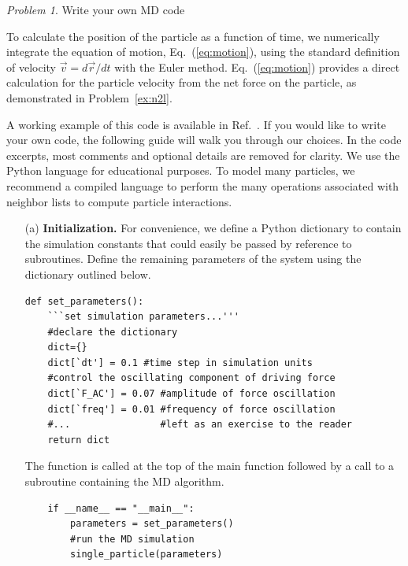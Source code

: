 \documentclass[preprint,showpacs,preprintnumbers,amsmath,amssymb,aps,prb]{revtex4-1}
\theoremstyle{remark}
\newtheorem{problem}{Problem}
\begin{document}
\begin{problem}{Write your own MD code}
  \label{ex:euler}
 
  \noindent To calculate the position of the particle
  as a function of time,
  we
  numerically integrate the equation of motion,
  Eq.~(\ref{eq:motion}),
  using
  the standard definition of velocity
  $\vec{v} = d\vec{r}/dt$ 
  with the %
  Euler method.
  Eq.~(\ref{eq:motion}) provides
  a direct calculation for the particle velocity
  from the net force on the particle,
  as demonstrated in Problem~\ref{ex:n2l}.

    A working example of this code is available
  in Ref.~.
  If you would like to write your own code,
  the following guide
  will walk you through our choices.
  In the code excerpts,
  most comments and optional details are removed for clarity.
We use the Python 
  language
  for educational purposes.
  To model many particles,
we recommend a   
  compiled  language
  to perform the many operations associated
  with neighbor lists to compute particle interactions.
  
  \begin{enumerate}
    
  \item[(a)] {\bf Initialization.}
    For convenience,
    we define a Python dictionary
    to contain the simulation constants
    that could easily be passed by reference
    to subroutines.
    Define 
    the remaining parameters of the system using the dictionary outlined below.
    \begin{verbatim}
def set_parameters():           
    ```set simulation parameters...'''
    #declare the dictionary     
    dict={}  
    dict[`dt'] = 0.1 #time step in simulation units
    #control the oscillating component of driving force
    dict[`F_AC'] = 0.07 #amplitude of force oscillation
    dict[`freq'] = 0.01 #frequency of force oscillation
    #...                #left as an exercise to the reader
    return dict
    \end{verbatim}

    The function is called at the top of the main function
    followed by a call to a subroutine
    containing the MD algorithm.
     \begin{verbatim}
    if __name__ == "__main__":
        parameters = set_parameters()
        #run the MD simulation
        single_particle(parameters)
\end{verbatim}


\end{enumerate}
\end{problem}
\end{document}
